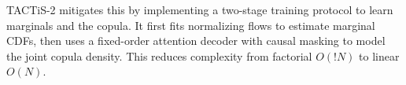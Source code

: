 \documentclass[a4paper,oneside,bibliography=totoc]{scrbook}
\begin{document}
TACTiS-2 \cite{ashok_tactis-2_2023} mitigates this by implementing a two-stage training protocol to learn marginals and the copula. It first fits normalizing flows to estimate marginal CDFs, then uses a fixed-order attention decoder with causal masking to model the joint copula density. This reduces complexity from factorial $O(!N)$ to linear $O(N)$.
\end{document}
